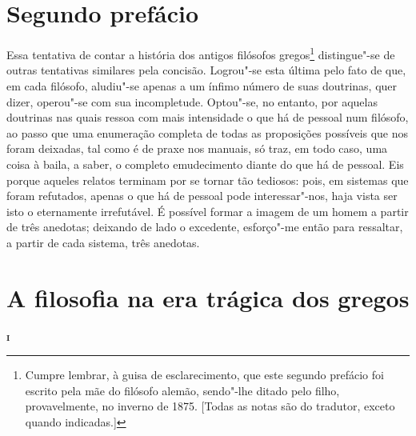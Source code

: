 \chapter{Segundo prefácio}


Essa tentativa de contar a história dos antigos filósofos
 gregos\footnote{Cumpre lembrar, à guisa de esclarecimento, que este segundo
 prefácio foi escrito pela mãe do filósofo alemão, sendo"-lhe ditado pelo
 filho, provavelmente, no inverno de 1875. [Todas as notas são do tradutor,
 exceto quando indicadas.]} distingue"-se de outras tentativas similares pela
 concisão. Logrou"-se esta última pelo fato de que, em cada filósofo,
 aludiu"-se apenas a um ínfimo número de suas doutrinas, quer dizer,
 operou"-se com sua incompletude. Optou"-se, no entanto, por aquelas
 doutrinas nas quais ressoa com mais intensidade o que há de pessoal num
 filósofo, ao passo que uma enumeração completa de todas as proposições
 possíveis que nos foram deixadas, tal como é de praxe nos manuais, só traz,
 em todo caso, uma coisa à baila, a saber, o completo emudecimento diante do
 que há de pessoal. Eis porque aqueles relatos terminam por se tornar tão
 tediosos: pois, em sistemas que foram refutados, apenas o que há de pessoal
 pode interessar"-nos, haja vista ser isto o eternamente irrefutável. É
 possível formar a imagem de um homem a partir de três anedotas; deixando de
 lado o excedente, esforço"-me então para ressaltar, a partir de cada
 sistema, três anedotas.

\chapter{A filosofia na era trágica dos gregos}

\textsc{\textbf{i}}
\bigskip

